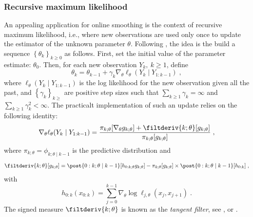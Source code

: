 \documentclass{article}
\newcommand{\md}[1]{g_{#1}}
\newcommand{\logllh}[1]{\ell_{#1}}
\newcommand{\pred}[1]{\pi_{#1}}
\newcommand{\parvec}{\theta}
\newcommand{\af}[1]{h_{#1}}
\newcommand{\deriv}{\nabla_{\parvec}}
\newcommand{\rmd}{\ensuremath{\mathrm{d}}}
\newcommand{\eqsp}{\;}
\newcommand{\qg}[1]{\ell_{#1}}
\begin{document}
\subsubsection*{Recursive maximum likelihood}

An appealing application for online smoothing is the context of recursive maximum likelihood, i.e., where new observations are used only once to update the estimator of the unknown parameter $\parvec$.
Following \cite{legland1997recursive}, the idea is the build a sequence $\left\lbrace\parvec_k\right\rbrace_{k\geq 0}$ as follows. First, set the initial value of the parameter estimate: $\parvec_0$. Then, for each new observation $Y_{k},~k\geqslant 1$, define
$$
\theta_{k} = \theta_{k-1} + \gamma_k \deriv \logllh{\parvec}(Y_k \mid Y_{1:k - 1}) \eqsp,
$$
where $\logllh{\parvec}(Y_k \mid Y_{1:k - 1})$ is the log likelihood for the new observation given all the past, and $\left\lbrace\gamma_k\right\rbrace_{k\geqslant}$ are positive step sizes such that $\sum_{k \geqslant 1}\gamma_k = \infty$ and $\sum_{k \geqslant 1}\gamma_k^2 < \infty$. The practicalt implementation of such an update relies on the following identity:
\begin{equation}
\deriv \logllh{\parvec}(Y_k \mid Y_{1:k - 1})  
=  \frac{\pred{k;\parvec}[\deriv \md{k;\parvec}] + \filtderiv{k;\parvec}[\md{k;\parvec}]}{\pred{k;\parvec}[\md{k;\parvec}]}\eqsp,
\label{eq:online:gradient}
\end{equation}
where $\pred{k;\parvec} = \phi_{k;\parvec \mid k - 1}$ is the predictive distribution  and 
$$\filtderiv{k;\parvec}[\md{k;\parvec}] = \post{0:k;\parvec \mid k - 1} [\af{0:k;\parvec} \md{k;\parvec}] - \pred{k;\parvec}[\md{k;\parvec}] \times \post{0:k;\parvec \mid k - 1 }[\af{0:k}]\eqsp,$$
with
\begin{equation}
\label{eq:complete:gradient:log}
\af{0:k}(x_{0:k}) =  \sum_{j = 0}^{k - 1} \deriv\log \qg{j, \parvec}(x_j,x_{j+1})\eqsp.
\end{equation}
The signed measure $\filtderiv{k;\parvec}$ is known as the \textit{tangent filter}, see \cite[Chapter~10]{cappe2005inference}, \cite{delmoral2015uniform} or \cite{olsson2020particle}. 
\end{document}
